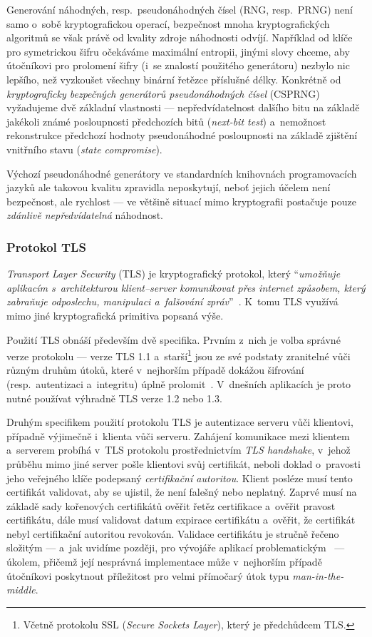 Generování náhodných, resp.\ pseudonáhodných čísel (RNG, resp.\ PRNG) není samo o~sobě kryptografickou operací, bez\-peč\-nost mnoha kryptografických algoritmů se však právě od kvality zdroje náhodnosti odvíjí. Například od klíče pro symetrickou šifru očekáváme maximální entropii, jinými slovy chceme, aby útočníkovi pro prolomení šifry (i~se znalostí použitého generátoru) nezbylo nic lepšího, než vyzkoušet všechny binární řetězce příslušné délky. Konkrétně od \emph{kryptograficky bezpečných generátorů pseudonáhodných čísel} (CSPRNG) vyžadujeme dvě základní vlastnosti --- nepředvídatelnost dalšího bitu na základě jakékoli známé posloupnosti předchozích bitů (\textit{next-bit test}) a~nemožnost rekonstrukce předchozí hodnoty pseudonáhodné posloupnosti na základě zjištění vnitřního stavu (\textit{state compromise}).~\cite{csprng}

Výchozí pseudonáhodné generátory ve standardních knihovnách programovacích jazyků ale takovou kvalitu zpravidla neposkytují, neboť jejich účelem není bezpečnost, ale rychlost --- ve většině situací mimo kryptografii postačuje pouze \emph{zdánlivě nepředvídatelná} náhodnost.

\subsubsection*{Protokol TLS}

\textit{Transport Layer Security} (TLS) je kryptografický protokol, který ``\textit{umožňuje aplikacím s~architekturou klient–server komunikovat přes internet způsobem, který zabraňuje odposlechu, manipulaci a~falšování zpráv}''~\cite{tls13rfc}. K~tomu TLS využívá mimo jiné kryptografická primitiva popsaná výše.

Použití TLS obnáší především dvě specifika. Prvním z~nich je volba správné verze protokolu --- verze TLS 1.1 a~starší\footnote{Včetně protokolu SSL (\textit{Secure Sockets Layer}), který je předchůdcem TLS.} jsou ze své podstaty zranitelné vůči různým druhům útoků, které v~nejhorším případě dokážou šifrování (resp.\ autentizaci a~integritu) úplně prolomit~\cite{poodle}. V~dnešních aplikacích je proto nutné používat výhradně TLS verze 1.2 nebo 1.3.

Druhým specifikem použití protokolu TLS je autentizace serveru vůči klientovi, případně výjimečně i~klienta vůči serveru. Zahájení komunikace mezi klientem a~serverem probíhá v~TLS protokolu prostřednictvím \textit{TLS handshake}, v~jehož průběhu mimo jiné server pošle klientovi svůj certifikát, neboli doklad o~pravosti jeho veřejného klíče podepsaný \emph{certifikační autoritou}. Klient posléze musí tento certifikát validovat, aby se ujistil, že není falešný nebo neplatný. Zaprvé musí na základě sady kořenových certifikátů ověřit řetěz certifikace a~ověřit pravost certifikátu, dále musí validovat datum expirace certifikátu a~ověřit, že certifikát nebyl certifikační autoritou revokován. Validace certifikátu je stručně řečeno složitým --- a~jak uvidíme později, pro vývojáře aplikací problematickým~\cite{comparing2017} --- úkolem, přičemž její nesprávná implementace může v~nejhorším případě útočníkovi poskytnout příležitost pro velmi přímočarý útok typu \textit{man-in-the-middle}.

